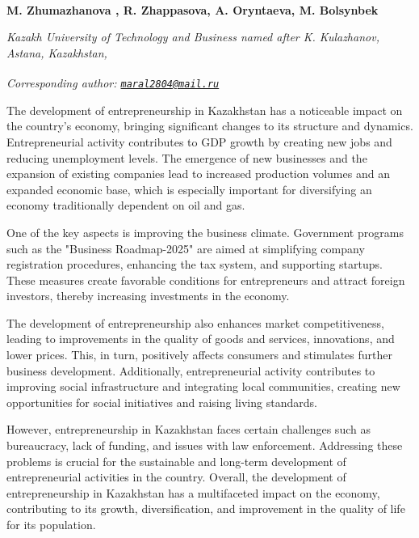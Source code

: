 
\begin{articleheader}

{\bfseries
M. Zhumazhanova\textsuperscript{\envelope } \authorid,
R. Zhappasova\authorid,
A. Oryntaeva\authorid,
M. Bolsynbek\authorid}
\end{articleheader}

\begin{affiliation}
\emph{Kazakh University of Technology and Business named after K. Kulazhanov, Astana, Kazakhstan,}

\raggedright \textsuperscript{\envelope }{\em Corresponding author: \href{mailto:maral2804@mail.ru}{\nolinkurl{maral2804@mail.ru}}}
\end{affiliation}

The development of entrepreneurship in Kazakhstan has a noticeable
impact on the country's economy, bringing significant changes to its
structure and dynamics. Entrepreneurial activity contributes to GDP
growth by creating new jobs and reducing unemployment levels. The
emergence of new businesses and the expansion of existing companies lead
to increased production volumes and an expanded economic base, which is
especially important for diversifying an economy traditionally dependent
on oil and gas.

One of the key aspects is improving the business climate. Government
programs such as the "Business Roadmap-2025" are aimed at simplifying
company registration procedures, enhancing the tax system, and
supporting startups. These measures create favorable conditions for
entrepreneurs and attract foreign investors, thereby increasing
investments in the economy.

The development of entrepreneurship also enhances market
competitiveness, leading to improvements in the quality of goods and
services, innovations, and lower prices. This, in turn, positively
affects consumers and stimulates further business development.
Additionally, entrepreneurial activity contributes to improving social
infrastructure and integrating local communities, creating new
opportunities for social initiatives and raising living standards.

However, entrepreneurship in Kazakhstan faces certain challenges such as
bureaucracy, lack of funding, and issues with law enforcement.
Addressing these problems is crucial for the sustainable and long-term
development of entrepreneurial activities in the country. Overall, the
development of entrepreneurship in Kazakhstan has a multifaceted impact
on the economy, contributing to its growth, diversification, and
improvement in the quality of life for its population.

